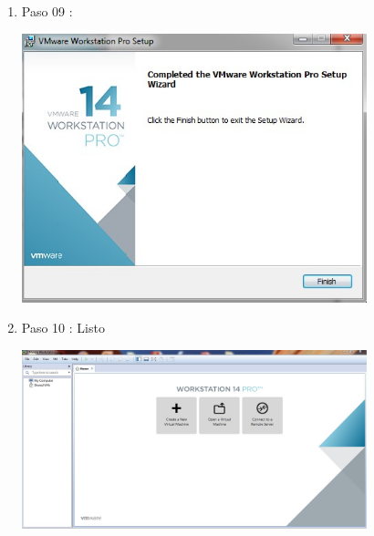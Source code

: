 \begin{enumerate}[1.]
	\hfill \break
	\hfill \break
	\hfill \break
	\hfill \break
	\hfill \break
	\hfill \break
	\hfill \break
	\hfill \break
	\item Paso 09 :

	\begin{center}
	\includegraphics[width=10cm]{./Imagenes/WM09} 
	\end{center}

	\item Paso 10 : Listo

	\begin{center}
	\includegraphics[width=10cm]{./Imagenes/WM10} 
	\end{center}
	
	

\end{enumerate} 

